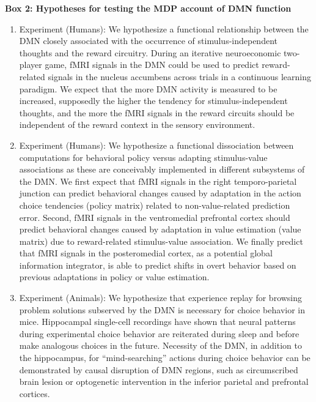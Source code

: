 \documentclass[10pt,letterpaper]{article}
\begin{document}
\begin{mdframed}
  \vspace{1em}
  \textbf{Box 2: Hypotheses for testing the MDP account of DMN function}
\begin{enumerate}
\item Experiment (Humans): We hypothesize a functional relationship between the DMN closely associated with the occurrence of stimulus-independent thoughts and the reward circuitry. During an iterative neuroeconomic two-player game, fMRI signals in the DMN could be used to predict reward-related signals in the nucleus accumbens across trials in a continuous learning paradigm. We expect that the more DMN activity is measured to be increased, supposedly the higher the tendency for stimulus-independent thoughts, and the more the fMRI signals in the reward circuits should be independent of the reward context
in the sensory environment.

\item Experiment (Humans): We hypothesize a functional dissociation between computations for behavioral policy versus adapting stimulus-value associations as these are conceivably implemented in different subsystems of the DMN. We first expect that fMRI signals in the right temporo-parietal junction can predict behavioral changes caused by adaptation in the action choice tendencies (policy matrix) related to non-value-related prediction error. Second, fMRI signals in the ventromedial prefrontal cortex should predict behavioral changes caused by adaptation in value estimation (value matrix) due to reward-related stimulus-value association. We finally predict that fMRI signals in the posteromedial cortex, as a potential global information integrator, is able to predict shifts in overt behavior based on previous adaptations in policy or value estimation.

\item Experiment (Animals): We hypothesize that experience replay for browsing problem solutions subserved by the DMN is necessary for choice behavior in mice. Hippocampal single-cell recordings have shown that neural patterns during experimental choice behavior are reiterated during sleep and before make analogous choices in the future. Necessity of the DMN, in addition to the hippocampus, for “mind-searching” actions during choice behavior can be demonstrated by causal disruption of DMN regions, such as circumscribed brain lesion or optogenetic intervention in the inferior parietal and prefrontal cortices.


\end{enumerate}
\end{mdframed}
\end{document}
